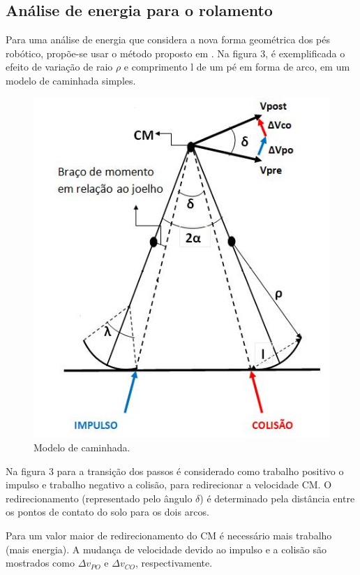 \subsection{Análise de energia para o rolamento}

Para uma análise de energia que considera a nova forma geométrica dos pés robótico, propõe-se usar o método proposto em  \cite{adamczyk2013}. Na figura 3, é exemplificada o efeito de variação de raio $\rho$ e comprimento l de um pé em forma de  arco, em um modelo de caminhada simples. 

\begin{figure}[!htb]
\centering
\includegraphics{centromassa}
\caption{ Modelo de caminhada.}
\label{Rotulo}
\end{figure}


Na figura 3 para a transição dos passos é considerado como trabalho positivo o impulso e trabalho negativo a colisão, para redirecionar a velocidade CM. O redirecionamento (representado pelo ângulo $\delta$) é determinado pela distância entre os pontos de contato do solo para os dois arcos.

Para um valor maior de redirecionamento do CM é necessário mais trabalho (mais energia). A mudança de velocidade devido ao impulso e a colisão são mostrados como  $\Delta v_{PO}$ e $\Delta v_{CO}$, respectivamente. 

